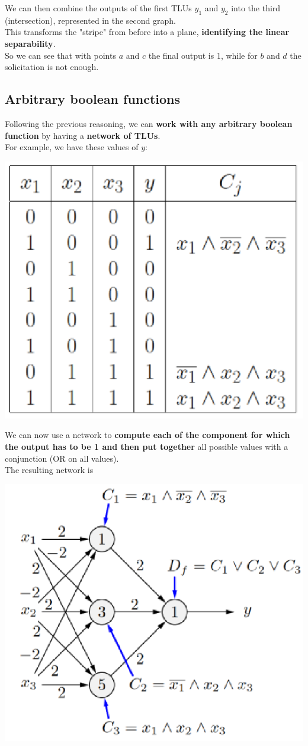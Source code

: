 We can then combine the outputs of the first TLUs $y_1$ and $y_2$ into the third (intersection), represented in the second graph. \\
This transforms the "stripe" from before into a plane, \textbf{identifying the linear separability}.\\

So we can see that with points $a$ and $c$ the final output is 1, while for $b$ and $d$ the solicitation is not enough.\\

\newpage

\subsection{Arbitrary boolean functions}
Following the previous reasoning, we can \textbf{work with any arbitrary boolean function} by having a \textbf{network of TLUs}.\\

For example, we have these values of $y$:
\begin{center}
	\includegraphics[width=0.35\columnwidth]{img/NN/ABF1}
\end{center}

We can now use a network to \textbf{compute each of the component for which the output has to be 1 and then put together} all possible values with a conjunction (OR on all values).\\

The resulting network is
\begin{center}
	\includegraphics[width=0.6\columnwidth]{img/NN/ABF2}
\end{center}

